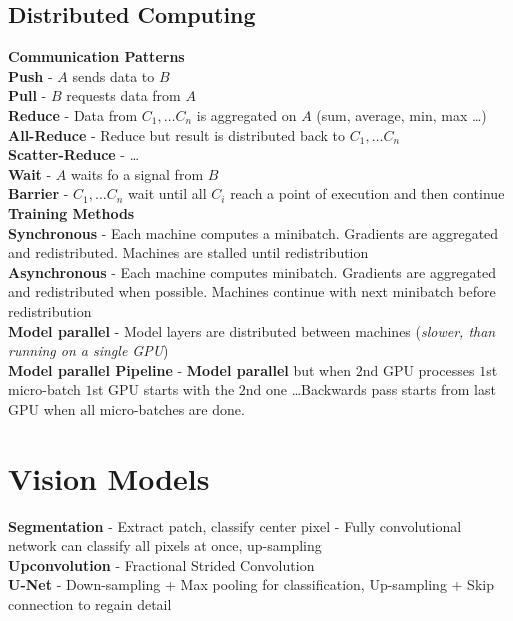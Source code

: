 \begin{multicols}{2}
\begin{mdframed}[style=eqbox]
        \subsection{Distributed Computing}
        \textbf{Communication Patterns}\\
        \textbf{Push} - $A$ sends data to $B$\\
        \textbf{Pull} - $B$ requests data from $A$\\
        \textbf{Reduce} - Data from $C_1, \dots C_n$ is aggregated on $A$ (sum, average, min, max \dots)\\
        \textbf{All-Reduce} - Reduce but result is distributed back to $C_1, \dots C_n$\\
        \textbf{Scatter-Reduce} - \dots\\
        \textbf{Wait} - $A$ waits fo a signal from $B$\\
        \textbf{Barrier} - $C_1, \dots C_n$ wait until all $C_i$ reach a point of execution and then continue\\[0.5em]
        \textbf{Training Methods}\\
        \textbf{Synchronous} - Each machine computes a minibatch. Gradients are aggregated and redistributed. Machines are stalled until redistribution\\
        \textbf{Asynchronous} - Each machine computes minibatch. Gradients are aggregated and redistributed when possible. Machines continue with next minibatch before redistribution\\
        \textbf{Model parallel} - Model layers are distributed between machines (\textit{slower, than running on a single GPU})\\
        \textbf{Model parallel Pipeline} - \textbf{Model parallel} but when $2$nd GPU processes $1$st micro-batch $1$st GPU starts with the $2$nd one \dots Backwards pass starts from last GPU when all micro-batches are done.
    \end{mdframed}

    \section{Vision Models}
    \begin{mdframed}[style=eqbox]
        \textbf{Segmentation} - Extract patch, classify center pixel - Fully convolutional network can classify all pixels at once, up-sampling\\
        \textbf{Upconvolution} - Fractional Strided Convolution\\
        \textbf{U-Net} - Down-sampling + Max pooling for classification, Up-sampling + Skip connection to regain detail

\end{mdframed}
\end{multicols}
